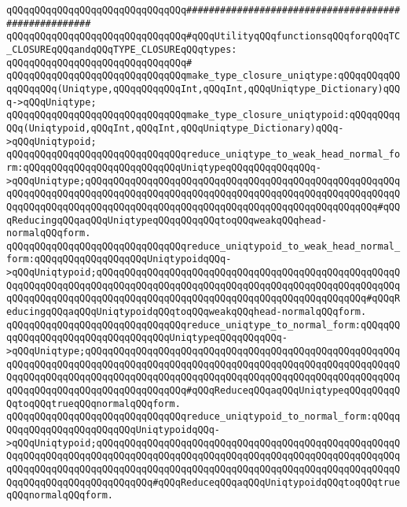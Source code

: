 \newline
\newline
\verb|qQQqqQQqqQQqqQQqqQQqqQQqqQQqqQQq#####################################################|\newline
\verb|qQQqqQQqqQQqqQQqqQQqqQQqqQQqqQQq#qQQqUtilityqQQqfunctionsqQQqforqQQqTC_CLOSUREqQQqandqQQqTYPE_CLOSUREqQQqtypes:|\newline
\verb|qQQqqQQqqQQqqQQqqQQqqQQqqQQqqQQq#|\newline
\verb|qQQqqQQqqQQqqQQqqQQqqQQqqQQqqQQqmake_type_closure_uniqtype:qQQqqQQqqQQqqQQqqQQq(Uniqtype,qQQqqQQqqQQqInt,qQQqInt,qQQqUniqtype_Dictionary)qQQq->qQQqUniqtype;|\newline
\verb|qQQqqQQqqQQqqQQqqQQqqQQqqQQqqQQqmake_type_closure_uniqtypoid:qQQqqQQqqQQq(Uniqtypoid,qQQqInt,qQQqInt,qQQqUniqtype_Dictionary)qQQq->qQQqUniqtypoid;|\newline
\newline
\verb|qQQqqQQqqQQqqQQqqQQqqQQqqQQqqQQqreduce_uniqtype_to_weak_head_normal_form:qQQqqQQqqQQqqQQqqQQqqQQqqQQqUniqtypeqQQqqQQqqQQqqQQq->qQQqUniqtype;qQQqqQQqqQQqqQQqqQQqqQQqqQQqqQQqqQQqqQQqqQQqqQQqqQQqqQQqqQQqqQQqqQQqqQQqqQQqqQQqqQQqqQQqqQQqqQQqqQQqqQQqqQQqqQQqqQQqqQQqqQQqqQQqqQQqqQQqqQQqqQQqqQQqqQQqqQQqqQQqqQQqqQQqqQQqqQQqqQQqqQQqqQQqqQQq#qQQqReducingqQQqaqQQqUniqtypeqQQqqQQqqQQqtoqQQqweakqQQqhead-normalqQQqform.|\newline
\verb|qQQqqQQqqQQqqQQqqQQqqQQqqQQqqQQqreduce_uniqtypoid_to_weak_head_normal_form:qQQqqQQqqQQqqQQqqQQqUniqtypoidqQQq->qQQqUniqtypoid;qQQqqQQqqQQqqQQqqQQqqQQqqQQqqQQqqQQqqQQqqQQqqQQqqQQqqQQqqQQqqQQqqQQqqQQqqQQqqQQqqQQqqQQqqQQqqQQqqQQqqQQqqQQqqQQqqQQqqQQqqQQqqQQqqQQqqQQqqQQqqQQqqQQqqQQqqQQqqQQqqQQqqQQqqQQqqQQqqQQqqQQqqQQq#qQQqReducingqQQqaqQQqUniqtypoidqQQqtoqQQqweakqQQqhead-normalqQQqform.|\newline
\newline
\verb|qQQqqQQqqQQqqQQqqQQqqQQqqQQqqQQqreduce_uniqtype_to_normal_form:qQQqqQQqqQQqqQQqqQQqqQQqqQQqqQQqqQQqUniqtypeqQQqqQQqqQQq->qQQqUniqtype;qQQqqQQqqQQqqQQqqQQqqQQqqQQqqQQqqQQqqQQqqQQqqQQqqQQqqQQqqQQqqQQqqQQqqQQqqQQqqQQqqQQqqQQqqQQqqQQqqQQqqQQqqQQqqQQqqQQqqQQqqQQqqQQqqQQqqQQqqQQqqQQqqQQqqQQqqQQqqQQqqQQqqQQqqQQqqQQqqQQqqQQqqQQqqQQqqQQqqQQqqQQqqQQqqQQqqQQqqQQqqQQqqQQq#qQQqReduceqQQqaqQQqUniqtypeqQQqqQQqqQQqtoqQQqtrueqQQqnormalqQQqform.|\newline
\verb|qQQqqQQqqQQqqQQqqQQqqQQqqQQqqQQqreduce_uniqtypoid_to_normal_form:qQQqqQQqqQQqqQQqqQQqqQQqqQQqUniqtypoidqQQq->qQQqUniqtypoid;qQQqqQQqqQQqqQQqqQQqqQQqqQQqqQQqqQQqqQQqqQQqqQQqqQQqqQQqqQQqqQQqqQQqqQQqqQQqqQQqqQQqqQQqqQQqqQQqqQQqqQQqqQQqqQQqqQQqqQQqqQQqqQQqqQQqqQQqqQQqqQQqqQQqqQQqqQQqqQQqqQQqqQQqqQQqqQQqqQQqqQQqqQQqqQQqqQQqqQQqqQQqqQQqqQQqqQQqqQQq#qQQqReduceqQQqaqQQqUniqtypoidqQQqtoqQQqtrueqQQqnormalqQQqform.|\newline
